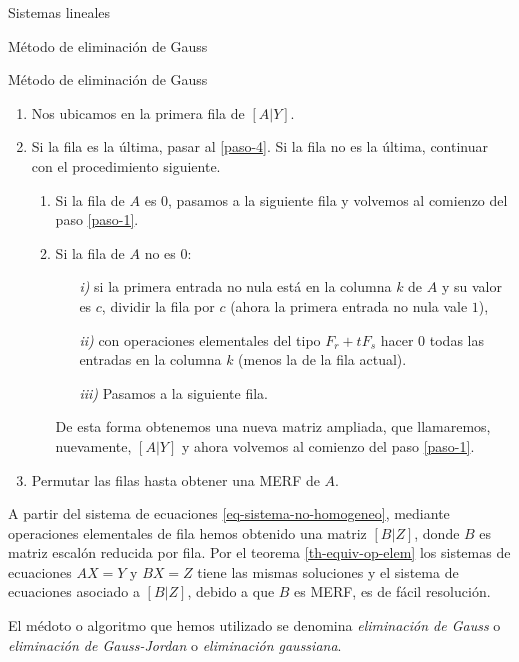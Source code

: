 \begin{chapter}{Sistemas lineales}
\begin{section}{Método de eliminación de Gauss }
\begin{subsection}{Método de eliminación de Gauss}
    \begin{enumerate}
        \item \label{paso-0} Nos ubicamos en la primera fila de $[A|Y]$.
        \item \label{paso-1}  Si la fila es la última, pasar al \ref{paso-4}. Si la fila no es la última, continuar con el procedimiento siguiente. 
        \begin{enumerate}
            \item \label{paso-1.1}  Si la fila de $A$ es $0$, pasamos a la siguiente fila y volvemos al comienzo del paso \ref{paso-1}.
            \item \label{paso-1.2} Si la fila de $A$  no es $0$: 
            \begin{enumerate}
                \item[\textit{i)}] si la primera entrada no nula está en  la columna $k$ de $A$ y su valor es $c$, dividir la fila por $c$ (ahora la primera entrada no nula vale $1$),
                \item[\textit{ii)}] con operaciones elementales del tipo $F_r+ tF_s$ hacer $0$  todas las entradas en la columna $k$ (menos la de la fila actual). 
                \item[\textit{iii)}] Pasamos a la siguiente fila.
            \end{enumerate}
            De esta forma obtenemos una nueva matriz ampliada,  que llamaremos, nuevamente, $[A|Y]$ y ahora volvemos al comienzo del paso \ref{paso-1}. 
        \end{enumerate}
        \item \label{paso-4} Permutar las filas hasta obtener una MERF de $A$. 
    \end{enumerate}

    A partir del sistema de ecuaciones \eqref{eq-sistema-no-homogeneo}, mediante operaciones elementales de fila hemos obtenido  una matriz $[B|Z]$, donde $B$ es matriz escalón reducida por fila. Por el teorema \ref{th-equiv-op-elem} los sistemas de ecuaciones $AX=Y$ y $BX=Z$ tiene las mismas soluciones y el sistema de ecuaciones asociado a $[B|Z]$,  debido a que $B$  es MERF, es de fácil resolución.  
    
    El médoto o  algoritmo que hemos utilizado se denomina \textit{eliminación de Gauss} o \textit{eliminación de Gauss-Jordan} o \textit{eliminación gaussiana}. 


\end{subsection}
\end{section}
\end{chapter}
